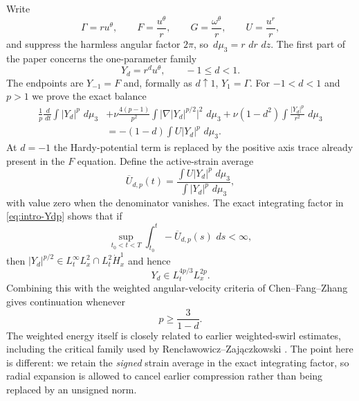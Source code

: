 \documentclass[11pt]{article}
\numberwithin{equation}{section}
\theoremstyle{definition}
\newcommand{\dd}{\,d}
\begin{document}
Write
\begin{equation}\label{eq:variables}
 \Gamma=ru^\theta,
 \qquad
 F=\frac{u^\theta}{r},
 \qquad
 G=\frac{\omega^\theta}{r},
 \qquad
 U=\frac{u^r}{r},
\end{equation}
and suppress the harmless angular factor $2\pi$, so $\dd\mu_3=r\,\dd r\,\dd z$.  The first part of the paper concerns the one-parameter family
\begin{equation}\label{eq:Yd-intro}
 Y_d=r^d u^\theta,
 \qquad -1\le d<1.
\end{equation}
The endpoints are $Y_{-1}=F$ and, formally as $d\uparrow1$, $Y_1=\Gamma$.  For $-1<d<1$ and $p>1$ we prove the exact balance
\begin{align}\label{eq:intro-Ydp}
 \frac1p\frac{\dd}{\dd t}\int |Y_d|^p\,\dd\mu_3
 &+\nu\frac{4(p-1)}{p^2}\int\bigl|\nabla |Y_d|^{p/2}\bigr|^2\,\dd\mu_3
 +\nu(1-d^2)\int\frac{|Y_d|^p}{r^2}\,\dd\mu_3 \\
 & =-(1-d)\int U|Y_d|^p\,\dd\mu_3.
\end{align}
At $d=-1$ the Hardy-potential term is replaced by the positive axis trace already present in the $F$ equation.  Define the active-strain average
\begin{equation}\label{eq:intro-Ubar-dp}
 \overline U_{d,p}(t)
 =\frac{\int U|Y_d|^p\,\dd\mu_3}{\int|Y_d|^p\,\dd\mu_3},
\end{equation}
with value zero when the denominator vanishes.  The exact integrating factor in \eqref{eq:intro-Ydp} shows that if
\begin{equation}\label{eq:intro-action-dp}
 \sup_{t_0<t<T}\int_{t_0}^t-\overline U_{d,p}(s)\,\dd s<\infty,
\end{equation}
then $|Y_d|^{p/2}\in L_t^\infty L_x^2\cap L_t^2\dot H_x^1$ and hence
\[
 Y_d\in L_t^{4p/3}L_x^{2p}.
\]
Combining this with the weighted angular-velocity criteria of Chen--Fang--Zhang \cite{ChenFangZhang2017} gives continuation whenever
\begin{equation}\label{eq:intro-dp-threshold}
 p\ge\frac{3}{1-d}.
\end{equation}
The weighted energy itself is closely related to earlier weighted-swirl estimates, including the critical family used by Renc\l awowicz--Zaj\k aczkowski \cite{RenclawowiczZajaczkowski2019}.  The point here is different: we retain the \emph{signed} strain average in the exact integrating factor, so radial expansion is allowed to cancel earlier compression rather than being replaced by an unsigned norm.
\end{document}
